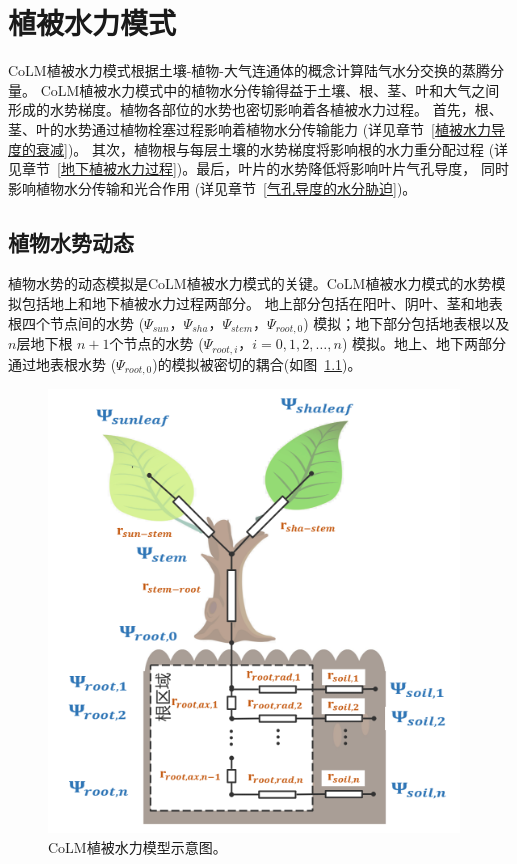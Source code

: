 \chapter{植被水力模式}

CoLM植被水力模式根据土壤-植物-大气连通体的概念计算陆气水分交换的蒸腾分量。
CoLM植被水力模式中的植物水分传输得益于土壤、根、茎、叶和大气之间形成的水势梯度。植物各部位的水势也密切影响着各植被水力过程。
首先，根、茎、叶的水势通过植物栓塞过程影响着植物水分传输能力 (详见章节~\ref{植被水力导度的衰减})。
其次，植物根与每层土壤的水势梯度将影响根的水力重分配过程 (详见章节~\ref{地下植被水力过程})。最后，叶片的水势降低将影响叶片气孔导度，
同时影响植物水分传输和光合作用 (详见章节~\ref{气孔导度的水分胁迫})。


\section{植物水势动态}\label{植物水势动态}
植物水势的动态模拟是CoLM植被水力模式的关键。CoLM植被水力模式的水势模拟包括地上和地下植被水力过程两部分。
地上部分包括在阳叶、阴叶、茎和地表根四个节点间的水势 ($\Psi_{sun}$，$\Psi_{sha}$，$\Psi_{stem}$，$\Psi_{root,0}$)
%
 模拟；地下部分包括地表根以及$n$层地下根 $n+1$个节点的水势 ($\Psi_{root,i}$，$i=0,1,2,\ldots,n$) 模拟。地上、地下两部分通过地表根水势
 ($\Psi_{root,0}$)的模拟被密切的耦合(如图~\ref{fig:CoLM植被水力模型示意图})。

{
\begin{figure}[htbp]
\centering
\includegraphics{Figures/植被水力模式/CoLM植被水力模型示意图.png}
\caption{CoLM植被水力模型示意图。}
\label{fig:CoLM植被水力模型示意图}
\end{figure}
}


